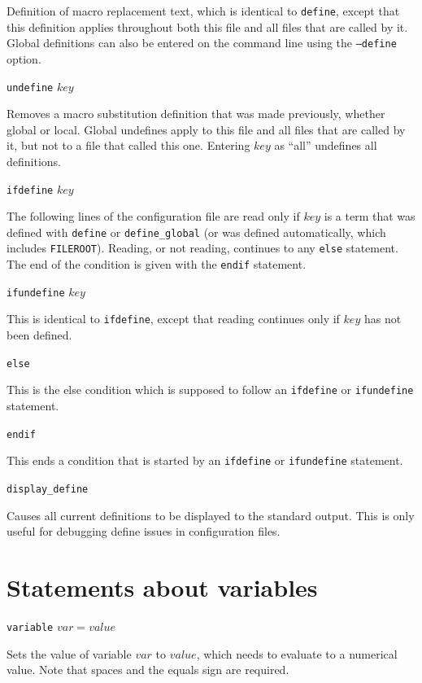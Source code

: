 \documentclass {book}
\newcommand {\ttt} {\texttt}
\begin{document}
\begin{description}
Definition of macro replacement text, which is identical to \ttt{define}, except that this definition applies throughout both this file and all files that are called by it. Global definitions can also be entered on the command line using the \ttt{--define} option.

\item{\ttt{undefine} $key$}

Removes a macro substitution definition that was made previously, whether global or local. Global undefines apply to this file and all files that are called by it, but not to a file that called this one. Entering $key$ as ``all'' undefines all definitions.

\item{\ttt{ifdefine} $key$}

The following lines of the configuration file are read only if $key$ is a term that was defined with \ttt{define} or \ttt{define\_global} (or was defined automatically, which includes \ttt{FILEROOT}). Reading, or not reading, continues to any \ttt{else} statement. The end of the condition is given with the \ttt{endif} statement.

\item{\ttt{ifundefine} $key$}

This is identical to \ttt{ifdefine}, except that reading continues only if $key$ has not been defined.

\item{\ttt{else}}

This is the else condition which is supposed to follow an \ttt{ifdefine} or \ttt{ifundefine} statement.

\item{\ttt{endif}}

This ends a condition that is started by an \ttt{ifdefine} or \ttt{ifundefine} statement.

\item{\ttt{display\_define}}

Causes all current definitions to be displayed to the standard output. This is only useful for debugging define issues in configuration files.

\end{description}

\section{Statements about variables}

\begin{description}

\item{\ttt{variable} $var = value$}

Sets the value of variable $var$ to $value$, which needs to evaluate to a numerical value. Note that spaces and the equals sign are required.

\end{description}
\end{document}
